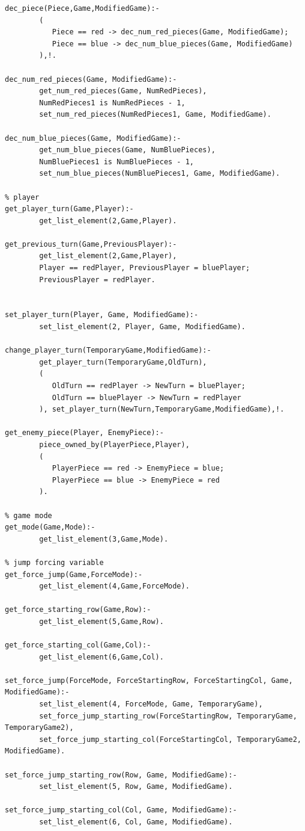 \documentclass[a4paper]{article}
\begin{document}
\begin{lstlisting}[style=customprologwithlines]
dec_piece(Piece,Game,ModifiedGame):-
        (
           Piece == red -> dec_num_red_pieces(Game, ModifiedGame);
           Piece == blue -> dec_num_blue_pieces(Game, ModifiedGame)
        ),!.

dec_num_red_pieces(Game, ModifiedGame):-
        get_num_red_pieces(Game, NumRedPieces),
        NumRedPieces1 is NumRedPieces - 1,
        set_num_red_pieces(NumRedPieces1, Game, ModifiedGame).

dec_num_blue_pieces(Game, ModifiedGame):-
        get_num_blue_pieces(Game, NumBluePieces),
        NumBluePieces1 is NumBluePieces - 1,
        set_num_blue_pieces(NumBluePieces1, Game, ModifiedGame).

% player
get_player_turn(Game,Player):-
        get_list_element(2,Game,Player).

get_previous_turn(Game,PreviousPlayer):-
        get_list_element(2,Game,Player),
        Player == redPlayer, PreviousPlayer = bluePlayer;
        PreviousPlayer = redPlayer.


set_player_turn(Player, Game, ModifiedGame):-
        set_list_element(2, Player, Game, ModifiedGame).

change_player_turn(TemporaryGame,ModifiedGame):-
        get_player_turn(TemporaryGame,OldTurn),
        (
           OldTurn == redPlayer -> NewTurn = bluePlayer;
           OldTurn == bluePlayer -> NewTurn = redPlayer
        ), set_player_turn(NewTurn,TemporaryGame,ModifiedGame),!.

get_enemy_piece(Player, EnemyPiece):-
        piece_owned_by(PlayerPiece,Player),
        (
           PlayerPiece == red -> EnemyPiece = blue;
           PlayerPiece == blue -> EnemyPiece = red
        ).

% game mode
get_mode(Game,Mode):-
        get_list_element(3,Game,Mode).

% jump forcing variable
get_force_jump(Game,ForceMode):-
        get_list_element(4,Game,ForceMode).

get_force_starting_row(Game,Row):-
        get_list_element(5,Game,Row).

get_force_starting_col(Game,Col):-
        get_list_element(6,Game,Col).

set_force_jump(ForceMode, ForceStartingRow, ForceStartingCol, Game, ModifiedGame):-
        set_list_element(4, ForceMode, Game, TemporaryGame),
        set_force_jump_starting_row(ForceStartingRow, TemporaryGame, TemporaryGame2),
        set_force_jump_starting_col(ForceStartingCol, TemporaryGame2, ModifiedGame).

set_force_jump_starting_row(Row, Game, ModifiedGame):-
        set_list_element(5, Row, Game, ModifiedGame).

set_force_jump_starting_col(Col, Game, ModifiedGame):-
        set_list_element(6, Col, Game, ModifiedGame).
\end{lstlisting}
\end{document}
